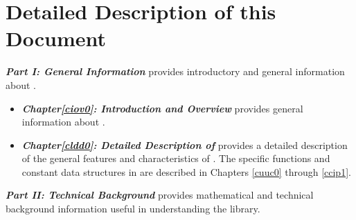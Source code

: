 \section{Detailed Description of this Document}
\label{ciov0:sotd0}

\emph{\textbf{Part I: General Information}} provides introductory
and general information about \emph{\productbasenameshort{}}.

\begin{itemize}
\item \emph{\textbf{Chapter\postchapterwordnonstretchable{}\ref{ciov0}: 
      Introduction and Overview}} provides general information
      about \emph{\productbasenameshort{}}.  
\item \emph{\textbf{Chapter\postchapterwordnonstretchable{}\ref{cldd0}: 
      Detailed Description of \productbasenameshort{}}}
      provides a detailed description 
      of the general features and characteristics
      of \emph{\productbasenameshort{}}\@.  The specific
      functions and constant data structures 
      in \emph{\productbasenameshort{}} are described in
      Chapters \ref{cuuc0} through \ref{ccip1}.
\end{itemize}

\emph{\textbf{Part II: Technical Background}} provides mathematical and 
technical background information useful in understanding the library.  

